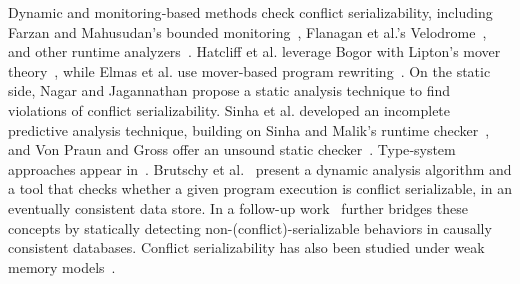 Dynamic and monitoring‐based methods check conflict serializability, including Farzan and Mahusudan’s bounded monitoring~\cite{FaMa08}, Flanagan et al.’s Velodrome~\cite{FlFrYi08}, and other runtime analyzers~\cite{FlFr04,XuBoRa05,WaSt06a,CoOlPnTuZu07,EmMaMa10,SiMaWaGu11a}. Hatcliff et al. leverage Bogor with Lipton’s mover theory~\cite{HaRoDw04,Li75}, while Elmas et al. use mover‐based program rewriting~\cite{ElQaSeSuTa10}. On the static side, Nagar and Jagannathan propose a static analysis technique to find violations of conflict 
serializability.
Sinha et al. developed an incomplete predictive analysis technique, building on Sinha and Malik’s runtime checker~\cite{SiMaWaGu11b,SiMa10}, and Von Praun and Gross offer an unsound static checker~\cite{VoGr04}. Type‐system approaches appear in~\cite{FlQa03,FlFrLiQa08}. 
Brutschy et al.~\cite{BrDiMuVe17} present a dynamic analysis algorithm and a 
tool that checks whether a given program execution is conflict serializable, in 
an eventually consistent data store. In a follow-up work~\cite{BrDiMuVe18} 
further bridges these concepts by statically detecting 
non-(conflict)-serializable behaviors in causally consistent databases.
Conflict serializability has also been studied under weak memory models~\cite{EnFa16}.

